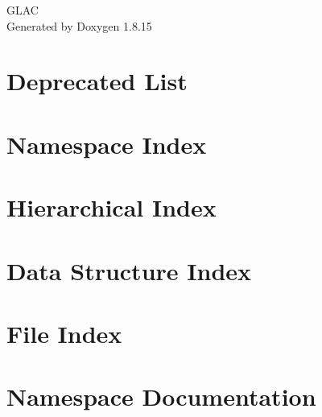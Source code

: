 \let\mypdfximage\pdfximage\def\pdfximage{\immediate\mypdfximage}\documentclass[twoside]{book}
\newcommand{\+}{\discretionary{\mbox{\scriptsize$\hookleftarrow$}}{}{}}
\newcommand{\clearemptydoublepage}{%
  \newpage{\pagestyle{empty}\cleardoublepage}%
}
\begin{document}
\hypersetup{pageanchor=false,
             bookmarksnumbered=true,
             pdfencoding=unicode
            }
\begin{titlepage}
\vspace*{7cm}
\begin{center}%
{\Large G\+L\+AC }\\
\vspace*{1cm}
{\large Generated by Doxygen 1.8.15}\\
\end{center}
\end{titlepage}
\clearemptydoublepage
{}
\tableofcontents
\clearemptydoublepage
{}
\hypersetup{pageanchor=true}

\chapter{Deprecated List}
\label{deprecated}

\chapter{Namespace Index}

\chapter{Hierarchical Index}

\chapter{Data Structure Index}

\chapter{File Index}

\chapter{Namespace Documentation}






\end{document}
